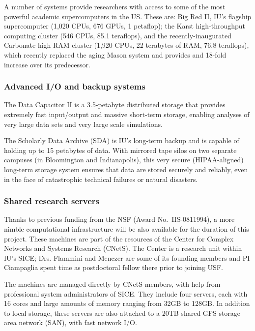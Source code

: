 A number of systems provide researchers with access to some of the most powerful academic supercomputers in the US. These are: Big Red II, IU’s flagship supercomputer (1,020 CPUs, 676 GPUs, 1 petaflop); the Karst high-throughput computing cluster (546 CPUs, 85.1 teraflops), and the recently-inaugurated Carbonate high-RAM cluster (1,920 CPUs, 22 terabytes of RAM, 76.8 teraflops), which recently replaced the aging Mason system and provides and 18-fold increase over its predecessor.

\subsubsection*{Advanced I/O and backup systems} 

The Data Capacitor II is a 3.5-petabyte distributed storage that provides extremely fast input/output and massive short-term storage, enabling analyses of very large data sets and very large scale simulations.

The Scholarly Data Archive (SDA) is IU’s long-term backup and is capable of holding up to 15 petabytes of data. With mirrored tape silos on two separate campuses (in Bloomington and Indianapolis), this very secure (HIPAA-aligned) long-term storage system ensures that data are stored securely and reliably, even in the face of catastrophic technical failures or natural disasters.

\subsubsection*{Shared research servers} 

Thanks to previous funding from the NSF (Award No.~IIS-0811994), a more nimble computational infrastructure will be also available for the duration of this project.
These machines are part of the resources of the Center for Complex Networks and Systems Research (CNetS). The Center is a research unit within IU's SICE; Drs. Flammini and Menczer are some of its founding members and PI Ciampaglia spent time as postdoctoral fellow there prior to joining USF. 

The machines are managed directly by CNetS members, with help from professional system administrators of SICE. They include four servers, each with 16 cores and large amounts of memory ranging from 32GB to 128GB. In addition to local storage, these servers are also attached to a 20TB shared GFS storage area network (SAN), with fast network I/O. 
